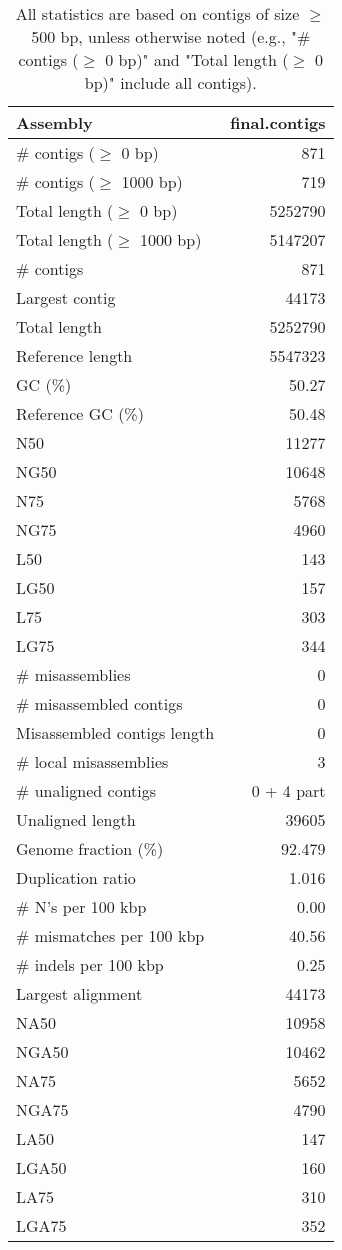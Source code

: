 \documentclass[12pt,a4paper]{article}
\begin{document}
\begin{table}[ht]
\begin{center}
\caption{All statistics are based on contigs of size $\geq$ 500 bp, unless otherwise noted (e.g., "\# contigs ($\geq$ 0 bp)" and "Total length ($\geq$ 0 bp)" include all contigs).}
\begin{tabular}{|l*{1}{|r}|}
\hline
Assembly & final.contigs \\ \hline
\# contigs ($\geq$ 0 bp) & 871 \\ \hline
\# contigs ($\geq$ 1000 bp) & 719 \\ \hline
Total length ($\geq$ 0 bp) & 5252790 \\ \hline
Total length ($\geq$ 1000 bp) & 5147207 \\ \hline
\# contigs & 871 \\ \hline
Largest contig & 44173 \\ \hline
Total length & 5252790 \\ \hline
Reference length & 5547323 \\ \hline
GC (\%) & 50.27 \\ \hline
Reference GC (\%) & 50.48 \\ \hline
N50 & 11277 \\ \hline
NG50 & 10648 \\ \hline
N75 & 5768 \\ \hline
NG75 & 4960 \\ \hline
L50 & 143 \\ \hline
LG50 & 157 \\ \hline
L75 & 303 \\ \hline
LG75 & 344 \\ \hline
\# misassemblies & 0 \\ \hline
\# misassembled contigs & 0 \\ \hline
Misassembled contigs length & 0 \\ \hline
\# local misassemblies & 3 \\ \hline
\# unaligned contigs & 0 + 4 part \\ \hline
Unaligned length & 39605 \\ \hline
Genome fraction (\%) & 92.479 \\ \hline
Duplication ratio & 1.016 \\ \hline
\# N's per 100 kbp & 0.00 \\ \hline
\# mismatches per 100 kbp & 40.56 \\ \hline
\# indels per 100 kbp & 0.25 \\ \hline
Largest alignment & 44173 \\ \hline
NA50 & 10958 \\ \hline
NGA50 & 10462 \\ \hline
NA75 & 5652 \\ \hline
NGA75 & 4790 \\ \hline
LA50 & 147 \\ \hline
LGA50 & 160 \\ \hline
LA75 & 310 \\ \hline
LGA75 & 352 \\ \hline
\end{tabular}
\end{center}
\end{table}
\end{document}
